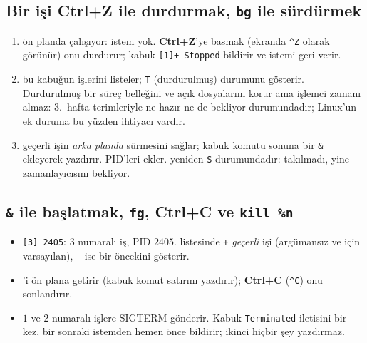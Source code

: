 \subsection{Bir işi Ctrl+Z ile durdurmak, \texttt{bg} ile sürdürmek}



\begin{enumerate}[leftmargin=1.4em]
  \item {} ön planda çalışıyor: istem yok. \textbf{Ctrl+Z}'ye basmak (ekranda \texttt{\^{}Z} olarak görünür) onu durdurur; kabuk \texttt{[1]+ Stopped} bildirir ve istemi geri verir.
  \item {} bu kabuğun işlerini listeler;  \texttt{T} (durdurulmuş) durumunu gösterir. Durdurulmuş bir süreç belleğini ve açık dosyalarını korur ama işlemci zamanı almaz: 3.~hafta terimleriyle ne hazır ne de bekliyor durumundadır; Linux'un ek duruma bu yüzden ihtiyacı vardır.
  \item {} geçerli işin \emph{arka planda} sürmesini sağlar; kabuk komutu sonuna bir \texttt{\&} ekleyerek yazdırır.  PID'leri ekler.  yeniden \texttt{S} durumundadır: takılmadı, yine zamanlayıcısını bekliyor.
\end{enumerate}

\subsection{\texttt{\&} ile başlatmak, \texttt{fg}, Ctrl+C ve \texttt{kill \%n}}



\begin{itemize}
  \item \texttt{[3] 2405}: $3$ numaralı iş, PID $2405$.  listesinde \texttt{+} \emph{geçerli} işi (argümansız  ve  için varsayılan), \texttt{-} ise bir öncekini gösterir.
  \item {} 'i ön plana getirir (kabuk komut satırını yazdırır); \textbf{Ctrl+C} (\texttt{\^{}C}) onu sonlandırır.
  \item {} $1$ ve $2$ numaralı işlere SIGTERM gönderir. Kabuk \texttt{Terminated} iletisini bir kez, bir sonraki istemden hemen önce bildirir; ikinci  hiçbir şey yazdırmaz.
\end{itemize}

